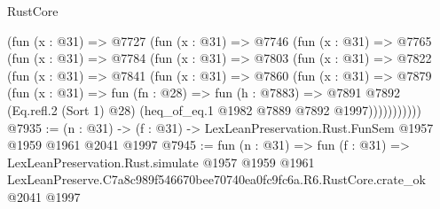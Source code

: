 \begin{lexlean}{RustCore}
\begin{coremodule}
    (fun (x : @31) =>
    @7727
      (fun (x : @31) =>
      @7746
        (fun (x : @31) =>
        @7765
          (fun (x : @31) =>
          @7784
            (fun (x : @31) =>
            @7803
              (fun (x : @31) =>
              @7822
                (fun (x : @31) =>
                @7841
                  (fun (x : @31) =>
                  @7860
                    (fun (x : @31) =>
                    @7879
                      (fun (x : @31) =>
                      fun (fn : @28) =>
                      fun (h : @7883) =>
                      @7891
                        @7892
                        (Eq.refl.{2} (Sort 1) @28)
                        (heq_of_eq.{1} @1982 @7889 @7892 @1997)))))))))))
@7935 := (n : @31) -> (f : @31) -> LexLeanPreservation.Rust.FunSem @1957 @1959 @1961 @2041 @1997
@7945 := fun (n : @31) =>
  fun (f : @31) =>
  LexLeanPreservation.Rust.simulate
    @1957
    @1959
    @1961
    LexLeanPreserve.C7a8c989f546670bee70740ea0fc9fc6a.R6.RustCore.crate_ok
    @2041
    @1997
\end{coremodule}
\end{lexlean}
